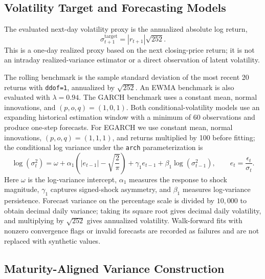 \documentclass[journal]{IEEEtran}
\begin{document}
\subsection{Volatility Target and Forecasting Models}

The evaluated next-day volatility proxy is the annualized absolute log return,
\begin{equation}
\sigma^{\mathrm{target}}_{t+1}=\left|r_{t+1}\right|\sqrt{252}.
\end{equation}
This is a one-day realized proxy based on the next closing-price return; it is not an intraday realized-variance estimator or a direct observation of latent volatility.

The rolling benchmark is the sample standard deviation of the most recent 20 returns with \texttt{ddof=1}, annualized by $\sqrt{252}$. An EWMA benchmark is also evaluated with $\lambda=0.94$. The GARCH benchmark uses a constant mean, normal innovations, and $(p,o,q)=(1,0,1)$. Both conditional-volatility models use an expanding historical estimation window with a minimum of 60 observations and produce one-step forecasts. For EGARCH we use constant mean, normal innovations, $(p,o,q)=(1,1,1)$, and returns multiplied by 100 before fitting; the conditional log variance under the \texttt{arch} parameterization is
\begin{equation}
\log(\sigma_t^2)=\omega+\alpha_1\left(\left|e_{t-1}\right|-\sqrt{\frac{2}{\pi}}\right)+\gamma_1 e_{t-1}+\beta_1\log(\sigma_{t-1}^2),
\qquad e_t=\frac{\epsilon_t}{\sigma_t}.
\end{equation}
Here $\omega$ is the log-variance intercept, $\alpha_1$ measures the response to shock magnitude, $\gamma_1$ captures signed-shock asymmetry, and $\beta_1$ measures log-variance persistence. Forecast variance on the percentage scale is divided by $10{,}000$ to obtain decimal daily variance; taking its square root gives decimal daily volatility, and multiplying by $\sqrt{252}$ gives annualized volatility. Walk-forward fits with nonzero convergence flags or invalid forecasts are recorded as failures and are not replaced with synthetic values.

\subsection{Maturity-Aligned Variance Construction}
\end{document}

